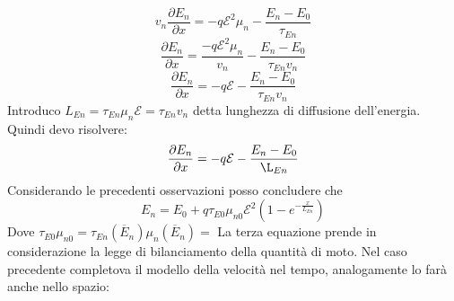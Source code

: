 \begin{equation}
    v_n \dfrac{\partial E_n}{\partial x}=-q\mathcal{E}^2 \mu_n -\dfrac{E_n-E_0}{\tau_{En}}
\end{equation}
\begin{equation}
    \dfrac{\partial E_n}{\partial x}= \dfrac{-q\mathcal{E}^2 \mu_n}{v_n} -\dfrac{E_n-E_0}{\tau_{En}v_n}
\end{equation}
\begin{equation}
    \dfrac{\partial E_n}{\partial x}=-q\mathcal{E} -\dfrac{E_n-E_0}{\tau_{En}v_n}
\end{equation}
Introduco $L_{En}=\tau_{En}\mu_n\mathcal{E}= \tau_{En}v_n$ detta lunghezza di diffusione dell'energia. Quindi devo risolvere:
\begin{equation}
     \dfrac{\partial E_n}{\partial x}=-q\mathcal{E} -\dfrac{E_n-E_0}{\L_{En}}
\end{equation}
Considerando le precedenti osservazioni posso concludere che
\begin{equation}
    E_n=E_0+q\tau_{E0}\mu_{n0}\mathcal{E}^2\left( 1-e^{-\frac{x}{L_{En}}}\right)
\end{equation}
Dove $\tau_{E0}\mu_{n0}=\tau_{En}(\overline{E}_n)\mu_{n}(\overline{E}_n)=$
La terza equazione prende in considerazione la legge di bilanciamento della quantità di moto. Nel caso precedente completova il modello della velocità nel tempo, analogamente lo farà anche nello spazio:


\cleardoublepage
